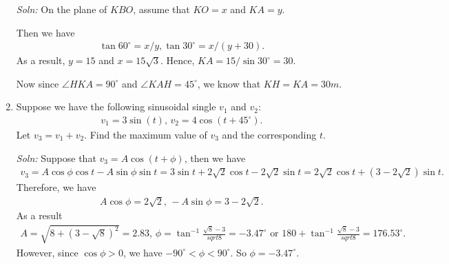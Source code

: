 \documentclass{article}
\begin{document}
\begin{enumerate}
   \begin{figure}[h]
    \centering
  \end{figure}

\emph{Soln:} On the plane of $KBO$, assume that $KO = x$ and $KA = y$. 
   \begin{figure}[h]
    \centering
  \end{figure}
Then we have
\begin{align*}
  \tan 60^\circ = x/y,\tan 30^\circ = x/(y+30).
\end{align*}
As a result, $y = 15$ and $x = 15\sqrt{3}$. Hence, $KA = 15/\sin 30^\circ = 30$.

Now since $\angle HKA=90^\circ$ and $\angle KAH = 45^\circ$, we know that $KH = KA = 30m$.
\newpage

 
\item Suppose we have the following sinusoidal single $v_1$ and $v_2$:
\begin{align*}
  v_1 = 3\sin(t),\,v_2 = 4\cos(t+45^\circ).
\end{align*}
Let $v_3 = v_1 + v_2$. Find the maximum value of $v_3$ and the corresponding $t$.

\emph{Soln:} Suppose that $v_3 = A \cos(t + \phi)$, then we have
\begin{align*}
  v_3 = A\cos \phi \cos t - A \sin \phi \sin t = 3\sin t+ 2\sqrt{2}\cos t - 2\sqrt{2} \sin t = 2\sqrt{2}\cos t + (3-2\sqrt{2})\sin t.
\end{align*}
Therefore, we have
\begin{align*}
  A\cos \phi = 2\sqrt{2},\,-A\sin \phi = 3-2\sqrt{2}.
\end{align*}
As a result
\begin{align*}
  A = \sqrt{8+(3-\sqrt{8})^2}=2.83,\,\phi = \tan^{-1}\frac{\sqrt{8}-3}{sqrt{8}} = -3.47^\circ\text{ or } 180 +\tan^{-1}\frac{\sqrt{8}-3}{sqrt{8}} = 176.53^\circ.
\end{align*}
However, since $\cos\phi > 0$, we have $-90^\circ < \phi < 90^\circ$. So $\phi = -3.47^\circ$.


\end{enumerate}
\end{document}
